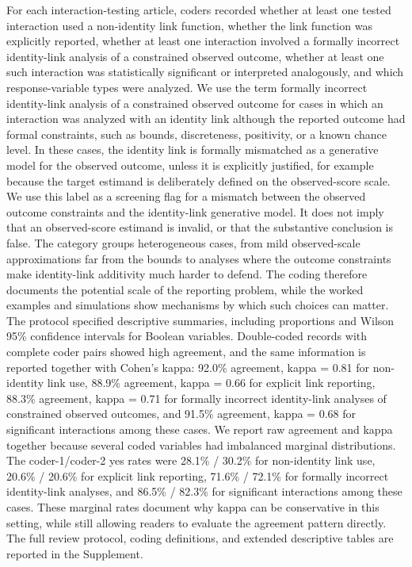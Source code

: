 \documentclass[
  man,
  longtable,
  nolmodern,
  notxfonts,
  notimes,
  colorlinks=true,linkcolor=blue,citecolor=blue,urlcolor=blue]{apa7}
\begin{document}
For each interaction-testing article, coders recorded whether at least
one tested interaction used a non-identity link function, whether the
link function was explicitly reported, whether at least one interaction
involved a formally incorrect identity-link analysis of a constrained
observed outcome, whether at least one such interaction was
statistically significant or interpreted analogously, and which
response-variable types were analyzed. We use the term formally
incorrect identity-link analysis of a constrained observed outcome for
cases in which an interaction was analyzed with an identity link
although the reported outcome had formal constraints, such as bounds,
discreteness, positivity, or a known chance level. In these cases, the
identity link is formally mismatched as a generative model for the
observed outcome, unless it is explicitly justified, for example because
the target estimand is deliberately defined on the observed-score scale.
We use this label as a screening flag for a mismatch between the
observed outcome constraints and the identity-link generative model. It
does not imply that an observed-score estimand is invalid, or that the
substantive conclusion is false. The category groups heterogeneous
cases, from mild observed-scale approximations far from the bounds to
analyses where the outcome constraints make identity-link additivity
much harder to defend. The coding therefore documents the potential
scale of the reporting problem, while the worked examples and
simulations show mechanisms by which such choices can matter. The
protocol specified descriptive summaries, including proportions and
Wilson 95\% confidence intervals for Boolean variables. Double-coded
records with complete coder pairs showed high agreement, and the same
information is reported together with Cohen's kappa: 92.0\% agreement,
kappa = 0.81 for non-identity link use, 88.9\% agreement, kappa = 0.66
for explicit link reporting, 88.3\% agreement, kappa = 0.71 for formally
incorrect identity-link analyses of constrained observed outcomes, and
91.5\% agreement, kappa = 0.68 for significant interactions among these
cases. We report raw agreement and kappa together because several coded
variables had imbalanced marginal distributions. The coder-1/coder-2 yes
rates were 28.1\% / 30.2\% for non-identity link use, 20.6\% / 20.6\%
for explicit link reporting, 71.6\% / 72.1\% for formally incorrect
identity-link analyses, and 86.5\% / 82.3\% for significant interactions
among these cases. These marginal rates document why kappa can be
conservative in this setting, while still allowing readers to evaluate
the agreement pattern directly. The full review protocol, coding
definitions, and extended descriptive tables are reported in the
Supplement.
\end{document}
